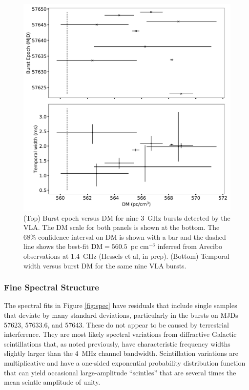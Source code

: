 \documentclass[twocolumn]{aastex61}
\begin{document}
\begin{figure}[htb]
\begin{center}
\includegraphics[width=\columnwidth]{burst_dmdt.pdf}
\caption{(Top) Burst epoch versus DM for nine 3~GHz bursts detected by the VLA. The DM scale for both panels is shown at the bottom. The 68\% confidence interval on DM is shown with a bar and the dashed line shows the best-fit DM$=560.5$\ pc cm$^{-3}$ inferred from Arecibo observations at 1.4~GHz (Hessels et al, in prep). (Bottom) Temporal width versus burst DM for the same nine VLA bursts.
\label{fig:dmdt}}
\end{center}
\end{figure}

\subsubsection{Fine Spectral Structure}

The spectral fits in Figure \ref{fig:spec} have residuals that include single samples that deviate by many standard deviations, particularly in the bursts on MJDs 57623,  57633.6, and 57643. These do not appear to be caused by terrestrial interference. They are most likely spectral variations from diffractive Galactic scintillations that, as noted previously, have characteristic frequency widths slightly larger than the 4~MHz channel bandwidth.  Scintillation variations are multiplicative and have a one-sided exponential probability distribution function that can yield occasional large-amplitude ``scintles'' that are several times the mean scintle amplitude of unity.
\end{document}

